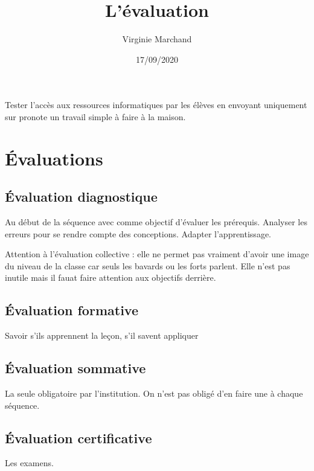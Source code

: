 \documentclass[12pt,a4paper]{article}
\title{L'évaluation}
\author{Virginie Marchand}
\date{17/09/2020}
\begin{document}
\maketitle

Tester l'accès aux ressources informatiques par les élèves en envoyant uniquement sur pronote un travail simple à faire à la maison.

\section{Évaluations}

\subsection{Évaluation diagnostique}

Au début de la séquence avec comme objectif d'évaluer les prérequis.
Analyser les erreurs pour se rendre compte des conceptions.
Adapter l'apprentissage.

Attention à l'évaluation collective : elle ne permet pas vraiment d'avoir une image du niveau de la classe car seuls les bavards ou les forts parlent.
Elle n'est pas inutile mais il fauat faire attention aux objectifs derrière.

\subsection{Évaluation formative}

Savoir s'ils apprennent la leçon, s'il savent appliquer

\subsection{Évaluation sommative}

La seule obligatoire par l'institution.
On n'est pas obligé d'en faire une à chaque séquence.

\subsection{Évaluation certificative}

Les examens.
\end{document}
